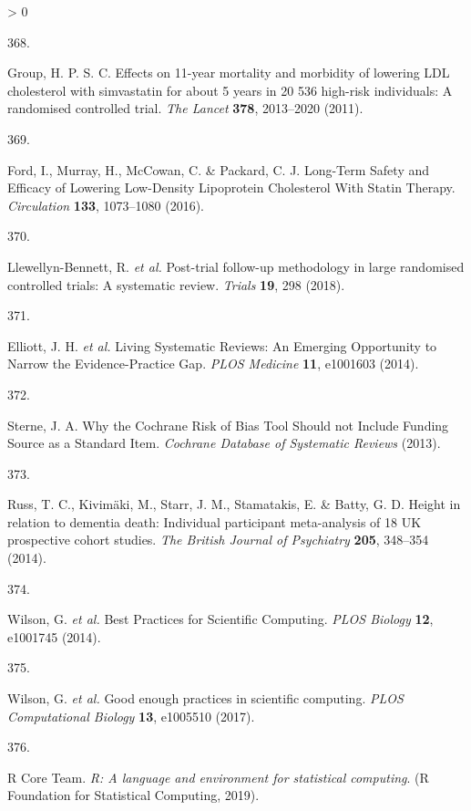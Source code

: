 \documentclass[a4paper, twoside]{templates/ociamthesis}
\newlength{\cslhangindent}
\newlength{\csllabelwidth}
\newenvironment{CSLReferences}[3] %
 {%
  \setlength{\parindent}{0pt}
  \ifodd #1 \everypar{\setlength{\hangindent}{\cslhangindent}}\ignorespaces\fi
  \ifnum #2 > 0
  \setlength{\parskip}{#2\baselineskip}
  \fi
 }%
 {}
\newcommand{\CSLLeftMargin}[1]{\parbox[t]{\maxof{\widthof{#1}}{\csllabelwidth}}{#1}}
\newcommand{\CSLRightInline}[1]{\parbox[t]{\linewidth - \csllabelwidth}{#1}}
\begin{document}
\begin{CSLReferences}{0}{0}
\leavevmode\hypertarget{ref-group2011}{}%
\CSLLeftMargin{368. }
\CSLRightInline{Group, H. P. S. C. Effects on 11-year mortality and morbidity of lowering {LDL} cholesterol with simvastatin for about 5 years in 20 536 high-risk individuals: A randomised controlled trial. \emph{The Lancet} \textbf{378}, 2013--2020 (2011).}

\leavevmode\hypertarget{ref-ford2016}{}%
\CSLLeftMargin{369. }
\CSLRightInline{Ford, I., Murray, H., McCowan, C. \& Packard, C. J. Long-{Term Safety} and {Efficacy} of {Lowering Low}-{Density Lipoprotein Cholesterol With Statin Therapy}. \emph{Circulation} \textbf{133}, 1073--1080 (2016).}

\leavevmode\hypertarget{ref-llewellyn-bennett2018}{}%
\CSLLeftMargin{370. }
\CSLRightInline{Llewellyn-Bennett, R. \emph{et al.} Post-trial follow-up methodology in large randomised controlled trials: A systematic review. \emph{Trials} \textbf{19}, 298 (2018).}

\leavevmode\hypertarget{ref-elliott2014}{}%
\CSLLeftMargin{371. }
\CSLRightInline{Elliott, J. H. \emph{et al.} Living {Systematic Reviews}: An {Emerging Opportunity} to {Narrow} the {Evidence}-{Practice Gap}. \emph{PLOS Medicine} \textbf{11}, e1001603 (2014).}

\leavevmode\hypertarget{ref-sterne2013}{}%
\CSLLeftMargin{372. }
\CSLRightInline{Sterne, J. A. Why the {Cochrane Risk} of {Bias Tool Should} not {Include Funding Source} as a {Standard Item}. \emph{Cochrane Database of Systematic Reviews} (2013).}

\leavevmode\hypertarget{ref-russ2014}{}%
\CSLLeftMargin{373. }
\CSLRightInline{Russ, T. C., Kivimäki, M., Starr, J. M., Stamatakis, E. \& Batty, G. D. Height in relation to dementia death: Individual participant meta-analysis of 18 {UK} prospective cohort studies. \emph{The British Journal of Psychiatry} \textbf{205}, 348--354 (2014).}

\leavevmode\hypertarget{ref-wilson2014}{}%
\CSLLeftMargin{374. }
\CSLRightInline{Wilson, G. \emph{et al.} Best {Practices} for {Scientific Computing}. \emph{PLOS Biology} \textbf{12}, e1001745 (2014).}

\leavevmode\hypertarget{ref-wilson2017}{}%
\CSLLeftMargin{375. }
\CSLRightInline{Wilson, G. \emph{et al.} Good enough practices in scientific computing. \emph{PLOS Computational Biology} \textbf{13}, e1005510 (2017).}

\leavevmode\hypertarget{ref-R-base}{}%
\CSLLeftMargin{376. }
\CSLRightInline{R Core Team. \emph{R: A language and environment for statistical computing}. ({R Foundation for Statistical Computing}, 2019).}


\end{CSLReferences}
\end{document}
